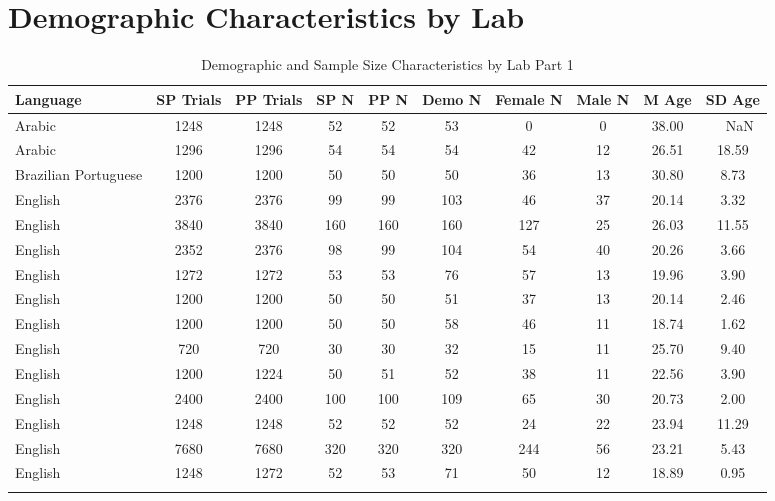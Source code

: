 \documentclass[
  man,floatsintext]{apa7}
\begin{document}
\hypertarget{demographic-characteristics-by-lab}{%
\section{Demographic Characteristics by Lab}\label{demographic-characteristics-by-lab}}

\begin{table}[tbp]

\begin{center}
\begin{threeparttable}

\caption{\label{tab:print-part1}Demographic and Sample Size Characteristics by Lab Part 1}

\footnotesize{

\begin{tabular}{lccccccccc}
\toprule
Language & SP 
Trials & PP 
Trials & SP 
N & PP 
N & Demo 
N & Female 
N & Male 
N & M 
Age & SD 
Age\\
\midrule
Arabic & 1248 & 1248 & 52 & 52 & 53 & 0 & 0 & 38.00 & \ \ NaN\\
Arabic & 1296 & 1296 & 54 & 54 & 54 & 42 & 12 & 26.51 & 18.59\\
Brazilian Portuguese & 1200 & 1200 & 50 & 50 & 50 & 36 & 13 & 30.80 & 8.73\\
English & 2376 & 2376 & 99 & 99 & 103 & 46 & 37 & 20.14 & 3.32\\
English & 3840 & 3840 & 160 & 160 & 160 & 127 & 25 & 26.03 & 11.55\\
English & 2352 & 2376 & 98 & 99 & 104 & 54 & 40 & 20.26 & 3.66\\
English & 1272 & 1272 & 53 & 53 & 76 & 57 & 13 & 19.96 & 3.90\\
English & 1200 & 1200 & 50 & 50 & 51 & 37 & 13 & 20.14 & 2.46\\
English & 1200 & 1200 & 50 & 50 & 58 & 46 & 11 & 18.74 & 1.62\\
English & 720 & 720 & 30 & 30 & 32 & 15 & 11 & 25.70 & 9.40\\
English & 1200 & 1224 & 50 & 51 & 52 & 38 & 11 & 22.56 & 3.90\\
English & 2400 & 2400 & 100 & 100 & 109 & 65 & 30 & 20.73 & 2.00\\
English & 1248 & 1248 & 52 & 52 & 52 & 24 & 22 & 23.94 & 11.29\\
English & 7680 & 7680 & 320 & 320 & 320 & 244 & 56 & 23.21 & 5.43\\
English & 1248 & 1272 & 52 & 53 & 71 & 50 & 12 & 18.89 & 0.95\\
\bottomrule
\addlinespace
\end{tabular}

}
\end{threeparttable}
\end{center}
\end{table}
\end{document}

